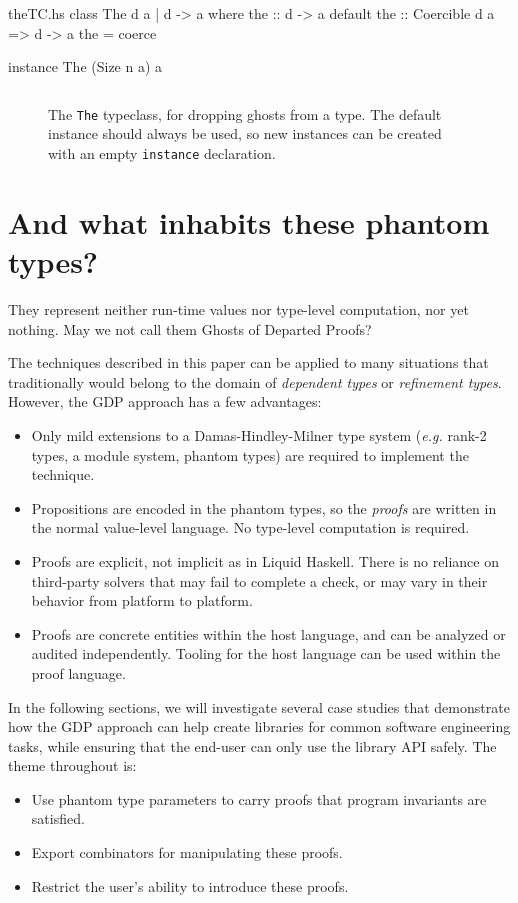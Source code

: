 \documentclass[format=sigplan, review=false, screen=true]{acmart}
\begin{document}
\begin{filecontents*}{theTC.hs}
class The d a | d -> a where
    the :: d -> a
    default the :: Coercible d a => d -> a
    the = coerce
    
instance The (Size n a) a
\end{filecontents*}

\begin{figure}
  \inputminted{haskell}{theTC.hs}
  \caption{The \texttt{The} typeclass, for dropping ghosts
    from a type. The default instance should always be used,
    so new instances can be created with an empty
    \texttt{instance} declaration.}
\end{figure}

\section{And what inhabits these phantom types?}
They represent neither run-time values nor type-level computation, nor yet nothing.
May we not call them Ghosts of Departed Proofs?

The techniques described in this paper can be applied to many
situations that traditionally would belong to the domain of
\emph{dependent types} or \emph{refinement types}. However, the
GDP approach has a few advantages:
\begin{itemize}
\item Only mild extensions to a Damas-Hindley-Milner type system
  ({\it e.g.} rank-2 types, a module system, phantom types) are required to
  implement the technique.
\item Propositions are encoded in the phantom types, so the
  \emph{proofs} are written in the normal value-level language.
  No type-level computation is required.
\item Proofs are explicit, not implicit as in Liquid Haskell. There is
  no reliance on third-party solvers that may fail to complete a check,
  or may vary in their behavior from platform to platform.
\item Proofs are concrete entities within the host language, and can
  be analyzed or audited independently. Tooling for the host language
  can be used within the proof language.
\end{itemize}

In the following sections, we will investigate several case studies that
demonstrate how the GDP approach can help create libraries for common
software engineering tasks, while ensuring that the end-user can only
use the library API safely. The theme throughout is:
\begin{itemize}
\item Use phantom type parameters to carry proofs that program invariants are satisfied.
\item Export combinators for manipulating these proofs.
\item Restrict the user's ability to introduce these proofs.
\end{itemize}
\end{document}
